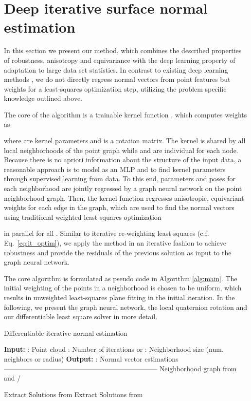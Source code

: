\documentclass[10pt,twocolumn,letterpaper]{article}
\begin{document}
\section{Deep iterative surface normal estimation}
In this section we present our method, which combines the described properties of robustness, anisotropy and equivariance with the deep learning property of adaptation to large data set statistics. In contrast to existing deep learning methods \cite{Ben-Shabat:2018, Guerrero:2018}, we do not directly regress normal vectors from point features but weights for a least-squares optimization step, utilizing the problem specific knowledge outlined above.

The core of the algorithm is a trainable kernel function , which computes weights as

where  are kernel parameters and  is a rotation matrix. The kernel is shared by all local neighborhoods of the point graph while  and  are individual for each node. Because there is no apriori information about the structure of the input data, a reasonable approach is to model  as an MLP and to find kernel parameters through supervised learning from data.  To this end, parameters  and poses  for each neighborhood are jointly regressed by a graph neural network on the point neighborhood graph. Then, the kernel function  regresses anisotropic, equivariant weights  for each edge in the graph, which are used to find the normal vectors using traditional weighted least-squares optimization

in parallel for all . 
Similar to iterative re-weighting least squares (c.f. Eq.~\ref{eq:it_optim}), we apply the method in an iterative fashion to achieve robustness and provide the residuals of the previous solution as input to the graph neural network. 

The core algorithm is formulated as pseudo code in Algorithm \ref{alg:main}. The initial weighting of the points in a neighborhood is chosen to be uniform, which results in unweighted least-squares plane fitting in the initial iteration.
In the following, we present the graph neural network, the local quaternion rotation and our differentiable least square solver in more detail.





\begin{algorithm}[t]
\caption{Differentiable iterative normal estimation}
    \label{alg:main}

\begin{algorithmic}
\State \textbf{Input:} 
\State : Point cloud
\State : Number of iterations 
\State  or : Neighborhood size (num. neighbors or radius)
\State \textbf{Output:} 
\State : Normal vector estimations
\State --------------------------------------------------------------------
\State  Neighborhood graph from  and  / 

 \State  
 \State  
 \State   Extract Solutions from 
 \For{} 
  \State  
  \State 
  \State 
  \State  
  \State  
  \State   Extract Solutions from 
\EndFor\\
\Return 
\end{algorithmic}
\end{algorithm}
\end{document}
